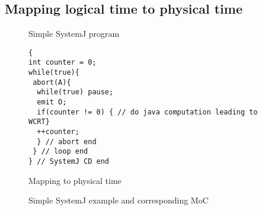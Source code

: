 \subsection{Mapping logical time to physical time}
\label{sec:mapping-logical-time}

\begin{figure}[t!]
\begin{SubFloat}{\label{fig:2a}Simple SystemJ program}%
\begin{minipage}[b]{0.3\linewidth}%
  \begin{scriptsize}
\begin{verbatim}
{
int counter = 0;
while(true){
 abort(A){
  while(true) pause; 
  emit O;
  if(counter != 0) { // do java computation leading to WCRT}
  ++counter;
  } // abort end
 } // loop end
} // SystemJ CD end
\end{verbatim}%
  \end{scriptsize}
\end{minipage}%
\end{SubFloat}
\hspace{1.5cm}%

\begin{SubFloat}{\label{fig:2c}Mapping to physical time}%
\scalebox{0.68}{}
\end{SubFloat}%
\caption{Simple SystemJ example and corresponding MoC}
\label{fig:2}
\end{figure}

